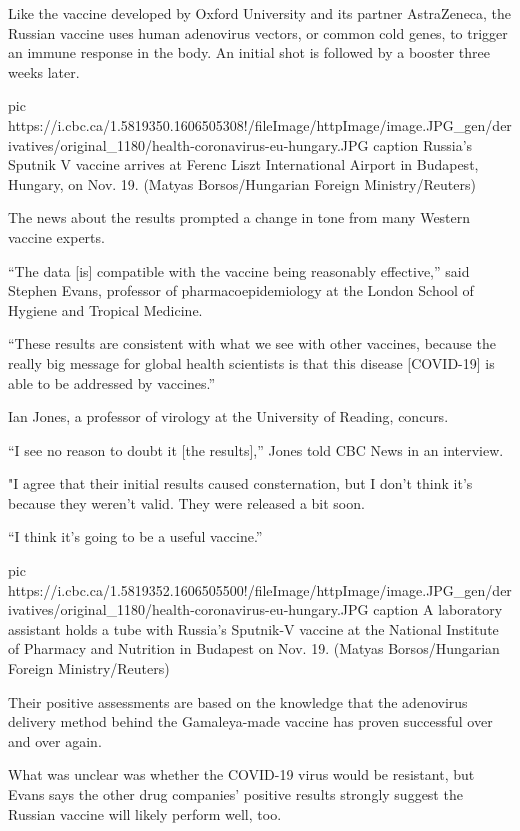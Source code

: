 Like the vaccine developed by Oxford University and its partner AstraZeneca,
the Russian vaccine uses human adenovirus vectors, or common cold genes, to
trigger an immune response in the body. An initial shot is followed by a
booster three weeks later.

\ifcmt
pic https://i.cbc.ca/1.5819350.1606505308!/fileImage/httpImage/image.JPG_gen/derivatives/original_1180/health-coronavirus-eu-hungary.JPG
caption Russia's Sputnik V vaccine arrives at Ferenc Liszt International Airport in Budapest, Hungary, on Nov. 19. (Matyas Borsos/Hungarian Foreign Ministry/Reuters)
\fi

The news about the results prompted a change in tone from many Western vaccine
experts. 

\enquote{The data [is] compatible with the vaccine being reasonably effective,} said
Stephen Evans, professor of pharmacoepidemiology at the London School of
Hygiene and Tropical Medicine.

\enquote{These results are consistent with what we see with other vaccines, because the
really big message for global health scientists is that this disease [COVID-19]
is able to be addressed by vaccines.}

Ian Jones, a professor of virology at the University of Reading, concurs.

\enquote{I see no reason to doubt it [the results],} Jones told CBC News in an
interview.    

"I agree that their initial results caused consternation, but I don't think
it's because they weren't valid. They were released a bit soon.

\enquote{I think it's going to be a useful vaccine.}

\ifcmt
pic https://i.cbc.ca/1.5819352.1606505500!/fileImage/httpImage/image.JPG_gen/derivatives/original_1180/health-coronavirus-eu-hungary.JPG
caption A laboratory assistant holds a tube with Russia's Sputnik-V vaccine at the National Institute of Pharmacy and Nutrition in Budapest on Nov. 19. (Matyas Borsos/Hungarian Foreign Ministry/Reuters)
\fi

Their positive assessments are based on the knowledge that the adenovirus
delivery method behind the Gamaleya-made vaccine has proven successful over and
over again.

What was unclear was whether the COVID-19 virus would be resistant, but Evans
says the other drug companies' positive results strongly suggest the Russian
vaccine will likely perform well, too.

